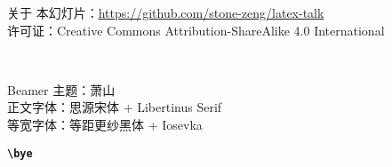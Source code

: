 \begin{frame}{关于}
\vspace*{1.2cm}
\footnotesize
本幻灯片：\url{https://github.com/stone-zeng/latex-talk} \\
许可证：Creative Commons Attribution-ShareAlike 4.0 International
\vspace{0.4cm}
\begin{center}
  \huge
  \faCreativeCommons\,\faCreativeCommonsBy\,\faCreativeCommonsSa
\end{center}
\vspace{2cm}
\begin{flushleft}
  \tiny
  Beamer 主题：萧山  \\
  正文字体：思源宋体 + Libertinus Serif \\
  等宽字体：等距更纱黑体 + Iosevka
\end{flushleft}
\vspace{-0.5cm}
\end{frame}

\begin{frame}[standout]
  \huge \textbf{\texttt{\textbackslash bye}}
\end{frame}
